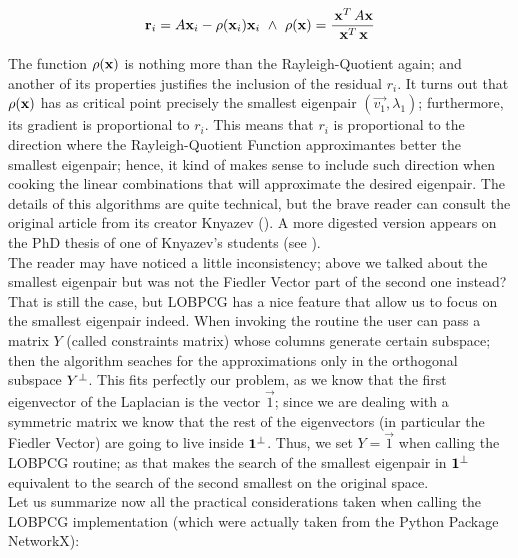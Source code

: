 \begin{equation*}
    \joinabove{0}
    \vec{r}_i = A\vec{x}_i - \func{\rho}(\vec{x}_i)\vec{x}_i
    \ds{\land}
    \func{\rho}(\vec{x}) = \dfrac{\trans{\vec{x}}A\vec{x}}{\trans{\vec{x}}\vec{x}}
\end{equation*}
\joinbelow{1cm}

The function $\operatorname{\rho}(\mathbf{x})$ is nothing more than the
Rayleigh-Quotient again; and another of its properties justifies the
inclusion of the residual $r_i$. It turns out that
$\operatorname{\rho}(\mathbf{x})$ has as critical point precisely the smallest
eigenpair $(\vec{v_1},\lambda_1)$; furthermore, its gradient is
proportional to $r_i$. This means that $r_i$ is proportional to the
direction where the Rayleigh-Quotient Function approximantes better
the smallest eigenpair; hence, it kind of makes sense to include such
direction when cooking the linear combinations that will approximate
the desired eigenpair. The details of this algorithms are quite
technical, but the brave reader can consult the original article from
its creator Knyazev (\cite{knyazev01}). A more digested version
appears on the PhD thesis of one of Knyazev's students (see
\cite{lashuk07}).  \\ 

The reader may have noticed a little inconsistency; above we talked about
the smallest eigenpair but was not the Fiedler Vector part of the
second one instead? That is still the case, but LOBPCG has a nice
feature that allow us to focus on the smallest eigenpair indeed. When
invoking the routine the user can pass a matrix $Y$ (called
constraints matrix) whose columns
generate certain subspace; then the algorithm seaches for the
approximations only in the orthogonal subspace ${Y}^{\bot}$. This fits
perfectly our problem, as we know that the first eigenvector of the
Laplacian is the vector $\vec{1}$; since we are dealing with a
symmetric matrix we know that the rest of the eigenvectors (in
particular the Fiedler Vector) are going to live inside
${\mathbf{1}}^{\bot}$. Thus, we set $Y = \vec{1}$ when calling the LOBPCG
routine; as that makes the search of the smallest eigenpair in
${\mathbf{1}}^{\bot}$ equivalent to the search of the second smallest on
the original space. \\

Let us summarize now all the practical considerations taken when
calling the LOBPCG implementation (which were actually taken from the
Python Package NetworkX):

